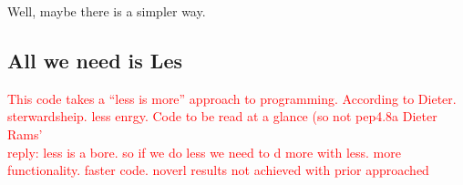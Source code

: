 \documentclass[landscape,	DIV=calc,%
							paper=letter,%
							fontsize=10pt,%
							twocolumn]{scrartcl}	 					%
\begin{document}
Well, maybe there is a simpler way.

\subsection*{All we need is Les}
\textcolor{red}{
This code takes a  ``less is more'' approach to programming. According to  Dieter. sterwardsheip. less enrgy. 
Code to be read at a glance (so not pep4.8a Dieter Rams'  
~\\
reply: less is a bore. so if we do less we need to d more with less. more functionality. faster code. noverl results not achieved with prior approached
}
\newpage
\end{document}
